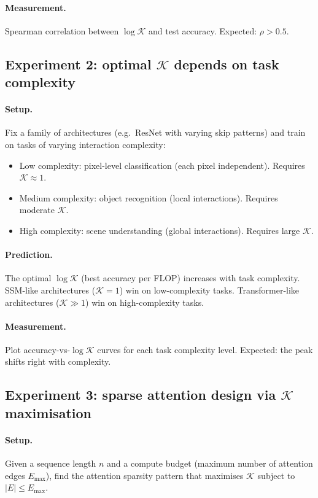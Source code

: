 \documentclass[11pt,a4paper]{article}
\newcommand{\K}{\mathcal{K}}
\begin{document}
\paragraph{Measurement.}
Spearman correlation between $\log \K$ and test accuracy.
Expected: $\rho > 0.5$.

\subsection{Experiment 2: optimal $\K$ depends on task complexity}

\paragraph{Setup.}
Fix a family of architectures (e.g.\ ResNet with varying skip
patterns) and train on tasks of varying interaction complexity:
\begin{itemize}
\item Low complexity: pixel-level classification (each pixel
  independent). Requires $\K \approx 1$.
\item Medium complexity: object recognition (local interactions).
  Requires moderate $\K$.
\item High complexity: scene understanding (global interactions).
  Requires large $\K$.
\end{itemize}

\paragraph{Prediction.}
The optimal $\log \K$ (best accuracy per FLOP) increases with task
complexity.  SSM-like architectures ($\K = 1$) win on low-complexity
tasks.  Transformer-like architectures ($\K \gg 1$) win on
high-complexity tasks.

\paragraph{Measurement.}
Plot accuracy-vs-$\log \K$ curves for each task complexity level.
Expected: the peak shifts right with complexity.

\subsection{Experiment 3: sparse attention design via $\K$ maximisation}

\paragraph{Setup.}
Given a sequence length $n$ and a compute budget (maximum number
of attention edges $E_{\max}$), find the attention sparsity pattern
that maximises $\K$ subject to $|E| \leq E_{\max}$.
\end{document}
